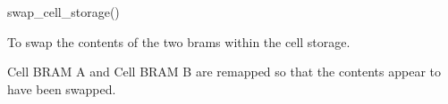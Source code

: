 

\format
swap\_cell\_storage()

\purpose

To swap the contents of the two brams within the cell storage.

\description

Cell BRAM A and Cell BRAM B are remapped so that the contents appear to have been swapped.
